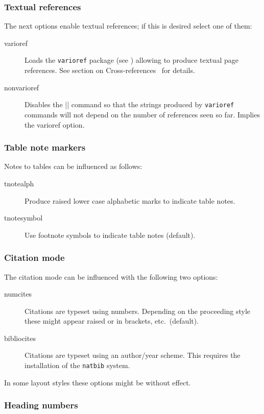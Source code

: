 \subsubsection{Textual references}

The next options enable textual references; if this is desired select
one of them:
\begin{description}
\item[varioref] Loads the \texttt{varioref} package
  (see \cite[p.68ff]{A-W:MG04})
  allowing to produce textual page references. See section on
  Cross-references~ for details.
\item[nonvarioref] Disables the || command so that the
  strings produced by \texttt{varioref} commands will not depend on
  the number of references seen so far. Implies the varioref option.
\end{description}

\subsubsection{Table note markers}

Notes to tables can be influenced as follows:
\begin{description}
\item[tnotealph] Produce raised lower case alphabetic marks to
  indicate table notes.
\item[tnotesymbol] Use footnote symbols to indicate table notes
  (default).
\end{description}

\subsubsection{Citation mode}

The citation mode can be influenced with the following two options:
\begin{description}
\item[numcites] Citations are typeset using numbers. Depending on the
  proceeding style these might appear raised or in brackets, etc.~(default).
\item[bibliocites] Citations are typeset using an author/year
  scheme. This requires the installation of the \texttt{natbib} system.
\end{description}
In some layout styles these options might be without effect.


\subsubsection{Heading numbers}


